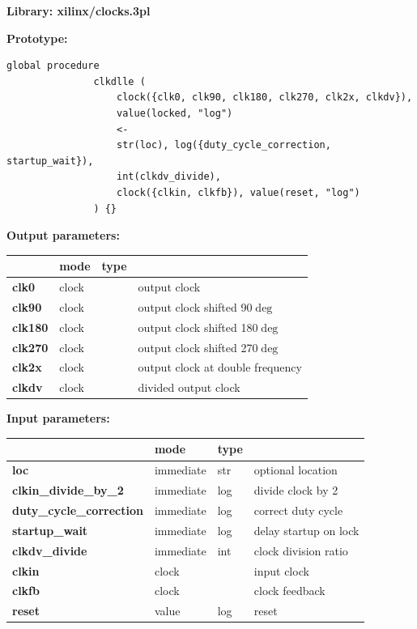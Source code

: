             {\bf Library: xilinx/clocks.3pl}

            {\bf Prototype:} \\
            \vsp
            \begin{lstlisting}[gobble=12, language=threepl]
               global procedure
               clkdlle (
                   clock({clk0, clk90, clk180, clk270, clk2x, clkdv}),
                   value(locked, "log")
                   <-
                   str(loc), log({duty_cycle_correction, startup_wait}),
                   int(clkdv_divide),
                   clock({clkin, clkfb}), value(reset, "log")
               ) {}
            \end{lstlisting}

            {\bf Output parameters:} \\
            \begin{tabular}{| l | l | l | l |}
            \hline
                           & mode  & type   & \\
            \hline \hline
            {\bf clk0}     & clock &        & output clock \\ \hline
            {\bf clk90}    & clock &        & output clock shifted 90$\deg$ \\ \hline
            {\bf clk180}   & clock &        & output clock shifted 180$\deg$ \\ \hline
            {\bf clk270}   & clock &        & output clock shifted 270$\deg$ \\ \hline
            {\bf clk2x}    & clock &        & output clock at double frequency \\ \hline
            {\bf clkdv}    & clock &        & divided output clock \\ \hline
            \end{tabular}

            {\bf Input parameters:} \\            
            \begin{tabular}{| l | l | l | l |}
            \hline
                           & mode  & type   & \\
            \hline \hline
            {\bf loc}                     & immediate & str   & optional location \\ \hline
            {\bf clkin\_divide\_by\_2}    & immediate & log   & divide clock by 2 \\ \hline
            {\bf duty\_cycle\_correction} & immediate & log   & correct duty cycle \\ \hline
            {\bf startup\_wait}           & immediate & log   & delay startup on lock \\ \hline
            {\bf clkdv\_divide}           & immediate & int   & clock division ratio \\ \hline
            {\bf clkin}                   & clock     &       & input clock \\ \hline
            {\bf clkfb}                   & clock     &       & clock feedback \\ \hline
            {\bf reset}                   & value     & log   & reset \\ \hline
            \end{tabular}

